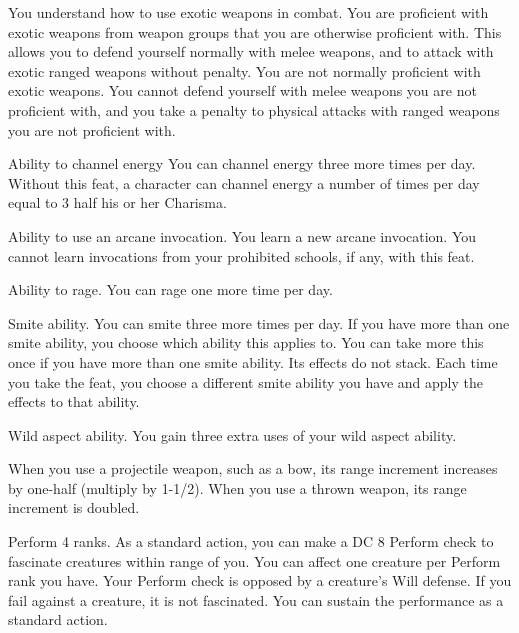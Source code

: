 You understand how to use exotic weapons in combat.
 You are proficient with exotic weapons from weapon groups that you are otherwise proficient with. This allows you to defend yourself normally with melee weapons, and to attack with exotic ranged weapons without penalty.
 You are not normally proficient with exotic weapons. You cannot defend yourself with melee weapons you are not proficient with, and you take a  penalty to physical attacks with ranged weapons you are not proficient with.

 Ability to channel energy
 You can channel energy three more times per day.
 Without this feat, a character can channel energy a number of times per day equal to 3 \add half his or her Charisma.

 Ability to use an arcane invocation.
 You learn a new arcane invocation. You cannot learn invocations from your prohibited schools, if any, with this feat.

 Ability to rage.
 You can rage one more time per day.

 Smite ability.
 You can smite three more times per day. If you have more than one smite ability, you choose which ability this applies to.
 You can take more this once if you have more than one smite ability. Its effects do not stack. Each time you take the feat, you choose a different smite ability you have and apply the effects to that ability.

 Wild aspect ability.
 You gain three extra uses of your wild aspect ability.

 When you use a projectile weapon, such as a bow, its range increment increases by one-half (multiply by 1-1/2). When you use a thrown weapon, its range increment is doubled.

\featpre Perform 4 ranks.
\featben As a standard action, you can make a DC 8 Perform check to fascinate creatures within \rngmed range of you. You can affect one creature per Perform rank you have. Your Perform check is opposed by a creature's Will defense. If you fail against a creature, it is not fascinated. You can sustain the performance as a standard action.

